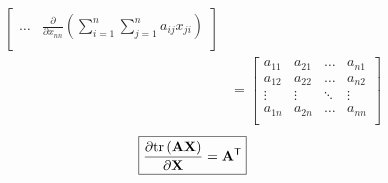 \documentclass{article}
\newcommand{\trans}{\mathsf{T}}
\begin{document}
\begin{align*}
\begin{bmatrix}
        \dots & 
        \displaystyle \frac{\partial}{\partial x_{nn}} \left( \sum_{i = 1}^{n} \sum_{j = 1}^{n} a_{ij}x_{ji} \right) \\
    \end{bmatrix} \\
    &= \begin{bmatrix}
            a_{11} & a_{21} & \dots & a_{n1} \\
            a_{12} & a_{22} & \dots & a_{n2} \\
            \vdots & \vdots & \ddots & \vdots \\
            a_{1n} & a_{2n} & \dots & a_{nn} \\
        \end{bmatrix}
\end{align*}
\begin{align}
    \boxed{\frac{\partial \textnormal{tr}\left(\mathbf{A} \mathbf{X}\right)}{\partial \mathbf{X}} = \mathbf{A}^\trans}
\end{align}
\end{document}
